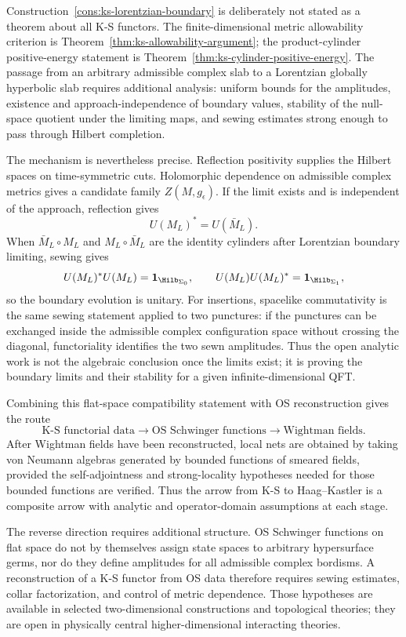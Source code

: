 Construction~\ref{cons:ks-lorentzian-boundary} is deliberately not stated as
a theorem about all K-S functors.  The finite-dimensional metric allowability
criterion is Theorem~\ref{thm:ks-allowability-argument}; the product-cylinder
positive-energy statement is Theorem~\ref{thm:ks-cylinder-positive-energy}.
The passage from an arbitrary admissible complex slab to a Lorentzian
globally hyperbolic slab requires additional analysis: uniform bounds for the
amplitudes, existence and approach-independence of boundary values, stability
of the null-space quotient under the limiting maps, and sewing estimates
strong enough to pass through Hilbert completion.

The mechanism is nevertheless precise.  Reflection positivity supplies the
Hilbert spaces on time-symmetric cuts.  Holomorphic dependence on admissible
complex metrics gives a candidate family \(Z(M,g_\epsilon)\).  If the limit
exists and is independent of the approach, reflection gives
\[
  U(M_L)^*=U(\bar M_L).
\]
When \(\bar M_L\circ M_L\) and \(M_L\circ\bar M_L\) are the identity
cylinders after Lorentzian boundary limiting, sewing gives
\[
  U(M_L)^*U(M_L)=\mathbf1_{\Hilb_{\Sigma_0}},
  \qquad
  U(M_L)U(M_L)^*=\mathbf1_{\Hilb_{\Sigma_1}},
\]
so the boundary evolution is unitary.  For insertions, spacelike
commutativity is the same sewing statement applied to two punctures: if the
punctures can be exchanged inside the admissible complex configuration space
without crossing the diagonal, functoriality identifies the two sewn
amplitudes.  Thus the open analytic work is not the algebraic conclusion
once the limits exist; it is proving the boundary limits and their stability
for a given infinite-dimensional QFT.

Combining this flat-space compatibility statement with OS reconstruction gives
the route
\[
  \text{K-S functorial data}
  \longrightarrow
  \text{OS Schwinger functions}
  \longrightarrow
  \text{Wightman fields}.
\]
After Wightman fields have been reconstructed, local nets are obtained by
taking von Neumann algebras generated by bounded functions of smeared fields,
provided the self-adjointness and strong-locality hypotheses needed for those
bounded functions are verified.  Thus the arrow from K-S to Haag--Kastler is
a composite arrow with analytic and operator-domain assumptions at each
stage.

The reverse direction requires additional structure.  OS Schwinger functions
on flat space do not by themselves assign state spaces to arbitrary
hypersurface germs, nor do they define amplitudes for all admissible complex
bordisms.  A reconstruction of a K-S functor from OS data therefore requires
sewing estimates, collar factorization, and control of metric dependence.
Those hypotheses are available in selected two-dimensional constructions and
topological theories; they are open in physically central higher-dimensional
interacting theories.

